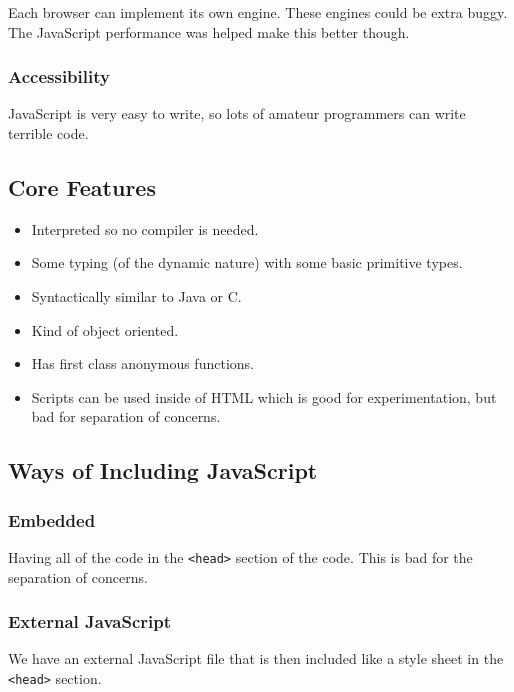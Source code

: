 Each browser can implement its own engine.
These engines could be extra buggy.
The JavaScript performance was helped make this better though.

\subsubsection{Accessibility}\label{ssub:accessibility}

JavaScript is very easy to write, so lots of amateur programmers can write terrible code.

\subsection{Core Features}\label{sub:core_features}

\begin{itemize}
	\item Interpreted so no compiler is needed.
	\item Some typing (of the dynamic nature) with some basic primitive types.
	\item Syntactically similar to Java or C.
	\item Kind of object oriented.
	\item Has first class anonymous functions.
	\item Scripts can be used inside of HTML which is good for experimentation, but bad for separation of concerns.
\end{itemize}

\subsection{Ways of Including JavaScript}\label{sub:ways_of_including_javascript}

\subsubsection{Embedded}\label{ssub:embedded}

Having all of the code in the \texttt{<head>} section of the code.
This is bad for the separation of concerns.

\subsubsection{External JavaScript}\label{ssub:external_javascript}

We have an external JavaScript file that is then included like a style sheet in the \texttt{<head>} section.

